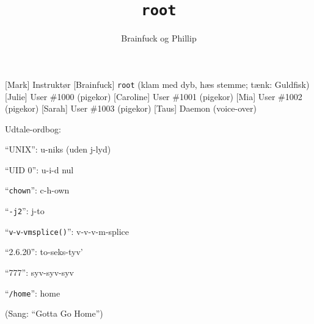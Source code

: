 \documentclass[a4paper,11pt]{article}
\title{\texttt{root}}
\author{Brainfuck og Phillip}
\begin{document}
\maketitle

\begin{roles}
[Mark] Instruktør
[Brainfuck] \texttt{root} (klam med dyb, hæs stemme; tænk: Guldfisk)
[Julie] User \#1000 (pigekor)
[Caroline] User \#1001 (pigekor)
[Mia] User \#1002 (pigekor)
[Sarah] User \#1003 (pigekor)
[Taus] Daemon (voice-over)
\end{roles}

\begin{sketch}

Udtale-ordbog:

``UNIX'': u-niks (uden j-lyd)

``UID 0'': u-i-d nul

``\texttt{chown}'': c-h-own

``\texttt{-j2}'': j-to

``\texttt{v}-\texttt{v}-\texttt{vmsplice()}'': v-v-v-m-splice

``2.6.20'': to-seks-tyv'

``777'': syv-syv-syv

``\texttt{/home}'': home

\end{sketch}

\begin{sketch}
(Sang: ``Gotta Go Home'')
\end{sketch}
\end{document}
